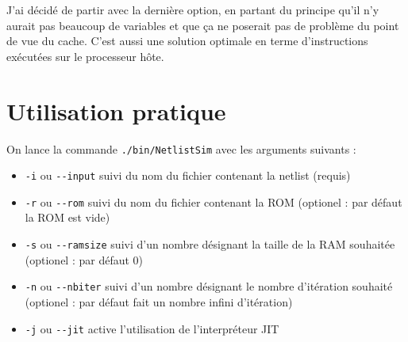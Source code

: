 \documentclass[12pt]{article}
\begin{document}
J'ai décidé de partir avec la dernière option, en partant du principe qu'il n'y aurait pas beaucoup de variables et que ça ne poserait pas de problème du point de vue du cache. C'est aussi une solution optimale en terme d'instructions exécutées sur le processeur hôte.

\section{Utilisation pratique}

On lance la commande \verb$./bin/NetlistSim$ avec les arguments suivants :

\begin{itemize}
    \item \verb$-i$ ou \verb$--input$ suivi du nom du fichier contenant la netlist (requis)
    \item \verb$-r$ ou \verb$--rom$ suivi du nom du fichier contenant la ROM (optionel : par défaut la ROM est vide)
    \item \verb$-s$ ou \verb$--ramsize$ suivi d'un nombre désignant la taille de la RAM souhaitée (optionel : par défaut 0)
    \item \verb$-n$ ou \verb$--nbiter$ suivi d'un nombre désignant le nombre d'itération souhaité (optionel : par défaut fait un nombre infini d'itération)
    \item \verb$-j$ ou \verb$--jit$ active l'utilisation de l'interpréteur JIT
\end{itemize}
\end{document}

